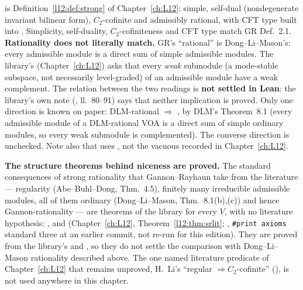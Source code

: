 \begin{dictionary}
 is Definition~\ref{l12:def:strong} of Chapter~\ref{ch:L12}: simple, self-dual
(nondegenerate invariant bilinear form), $C_2$-cofinite and admissibly rational, with CFT type built into
. Simplicity, self-duality, $C_2$-cofiniteness and CFT type match GR Def.~2.1.
\textbf{Rationality does not literally match.} GR's ``rational'' is Dong--Li--Mason's: every admissible module is a direct
sum of simple admissible modules. The library's  (Chapter~\ref{ch:L12}) asks that every
\emph{weak} submodule (a mode-stable subspace, not necessarily level-graded) of an admissible module have a weak
complement. The relation between the two readings is \textbf{not settled in Lean}: the library's own note
(, ll.~80--91) says that neither implication is
proved. Only one direction is known on paper: DLM-rational $\Rightarrow$ , by DLM's Theorem~8.1
(every admissible module of a DLM-rational VOA is a direct sum of simple ordinary modules, so every weak submodule is
complemented). The converse direction is unchecked. Note also that  uses
, not the vacuous  recorded in Chapter~\ref{ch:L12}.

\textbf{The structure theorems behind niceness are proved.} The standard consequences of strong rationality that
Gannon--Rayhaun take from the literature --- regularity (Abe--Buhl--Dong, Thm.~4.5), finitely many irreducible admissible
modules, all of them ordinary (Dong--Li--Mason, Thm.~8.1(b),(c)) and hence Gannon-rationality --- are theorems of the library
for every  $V$, with no literature hypothesis: ,
 and  (Chapter~\ref{ch:L12},
Theorem~\ref{l12:thm:srlit}; ,
\texttt{\#print axioms} standard three at an earlier commit, not re-run for this edition). They are proved from the library's  and
, so they do not settle the comparison with Dong--Li--Mason rationality described above. The one named
literature predicate of Chapter~\ref{ch:L12} that remains unproved, H.~Li's ``regular $\Rightarrow C_2$-cofinite''
(), is not used anywhere in this chapter.
\end{dictionary}

